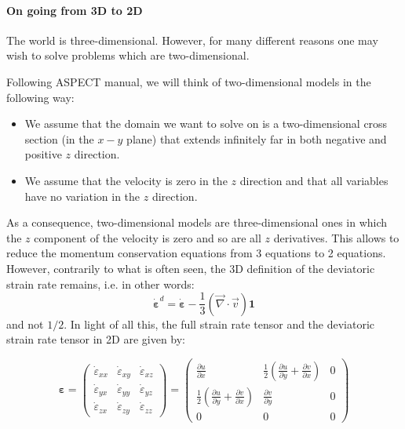 \paragraph{On going from 3D to 2D}

The world is three-dimensional. However, for many different reasons one may wish to solve problems
which are two-dimensional. 

Following ASPECT manual, we  will think of two-dimensional models in the following way: 
\begin{itemize}
\item We assume that the domain we want to solve on is a two-dimensional cross section (in the $x-y$ plane) 
that extends infinitely far in both negative and positive $z$ direction.  
\item We assume that the velocity is zero in the $z$ direction and that all variables 
have no variation in the $z$ direction. 
\end{itemize}

As a consequence, two-dimensional models are three-dimensional ones in which the $z$ 
component of the velocity is zero and so are all $z$ derivatives.
This allows to reduce the momentum conservation equations from 3 equations to 2 equations. 
However, contrarily to what is often seen, the 3D definition of the deviatoric strain rate 
remains, i.e. in other words:
\[
\dot{\bm \varepsilon}^d = \dot{\bm \varepsilon} -\frac{1}{3}(\vec\nabla\cdot\vec v) {\bm 1} 
\]
and not $1/2$.
In light of all this, the full strain rate tensor and the 
deviatoric strain rate tensor in 2D are given by:

\[
{\bm \varepsilon}=
\left(
\begin{array}{ccc}
\dot\varepsilon_{xx} & \dot\varepsilon_{xy} & \dot\varepsilon_{xz} \\ 
\dot\varepsilon_{yx} & \dot\varepsilon_{yy} & \dot\varepsilon_{yz} \\ 
\dot\varepsilon_{zx} & \dot\varepsilon_{zy} & \dot\varepsilon_{zz} 
\end{array}
\right)
=
\left(
\begin{array}{ccc}
\frac{\partial u}{\partial x} & \frac{1}{2}\left(\frac{\partial u}{\partial y} + \frac{\partial v}{\partial x}\right)  & 0 \\
\frac{1}{2}\left(\frac{\partial u}{\partial y} + \frac{\partial v}{\partial x}\right)  &  \frac{\partial v}{\partial y} & 0 \\
0 & 0 & 0
\end{array}
\right)
\]

